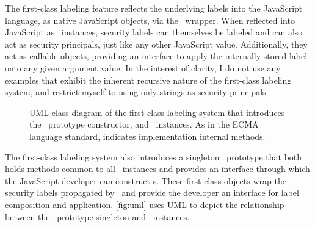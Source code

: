 The first-class labeling feature reflects the underlying labels into the JavaScript language, as native JavaScript objects, via the \FlowLabelObject\ wrapper.
When reflected into JavaScript as \FlowLabelObject\ instances, security labels can themselves be labeled and can also act as security principals, just like any other JavaScript value.
Additionally, they act as callable objects, providing an interface to apply the internally stored label onto any given argument value.
In the interest of clarity, I do not use any examples that exhibit the inherent recursive nature of the first-class labeling system, and restrict myself to using only strings as security principals.

\begin{figure}[ht]
  \centering
{}
  \caption{UML class diagram of the first-class labeling system that introduces the \FlowLabel\ prototype constructor, and \FlowLabelObject\ instances.
  As in the ECMA~\cite{ecma} language standard, \bracketdbl{\textbullet} indicates implementation internal methods.}
  \label{fig:uml}
\end{figure}

The first-class labeling system also introduces a singleton \FlowLabel\ prototype that both holds methods common to all \FlowLabelObject\ instances and provides an interface through which the JavaScript developer can construct \FlowLabelObject s.
These first-class objects wrap the security labels propagated by \FlowCore\ and provide the developer an interface for label composition and application.
\autoref{fig:uml} uses UML to depict the relationship between the \FlowLabel\ prototype singleton and \FlowLabelObject\ instances.

